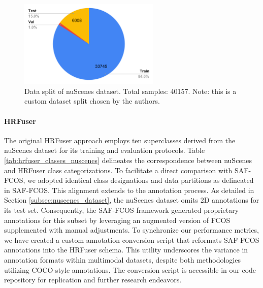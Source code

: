 \documentclass[report.tex]{subfiles}
\begin{document}
\begin{itemize}
            \begin{figure}[h!]
                \centering
                \includegraphics[width=0.6\textwidth]{images/methods/saf_fcos/data_split.pdf}
                \caption{Data split of nuScenes dataset. Total samples: 40157. Note: this is a custom dataset split chosen by the authors.}
                \label{fig:saffcos_data_split}
            \end{figure}

            \paragraph*{HRFuser}

            The original HRFuser approach employs ten superclasses derived from the nuScenes dataset for its training and evaluation protocols. Table \ref{tab:hrfuser_classes_nuscenes} delineates the correspondence between nuScenes and HRFuser class categorizations. To facilitate a direct comparison with SAF-FCOS, we adopted identical class designations and data partitions as delineated in SAF-FCOS. This alignment extends to the annotation process. As detailed in Section \ref{subsec:nuscenes_dataset}, the nuScenes dataset omits 2D annotations for its test set. Consequently, the SAF-FCOS framework generated proprietary annotations for this subset by leveraging an augmented version of FCOS supplemented with manual adjustments. To synchronize our performance metrics, we have created a custom annotation conversion script that reformats SAF-FCOS annotations into the HRFuser schema. This utility underscores the variance in annotation formats within multimodal datasets, despite both methodologies utilizing COCO-style annotations. The conversion script is accessible in our code repository for replication and further research endeavors.


\end{itemize}
\end{document}
